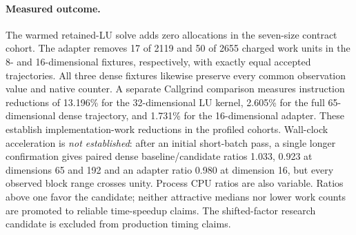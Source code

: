 \paragraph{Measured outcome.}
The warmed retained-LU solve adds zero allocations in the seven-size contract
cohort. The adapter removes 17 of 2119 and 50 of 2655 charged work units in the
8- and 16-dimensional fixtures, respectively, with exactly equal accepted
trajectories. All three dense fixtures likewise preserve every common observation
value and native counter. A separate Callgrind comparison measures instruction
reductions of 13.196\% for the 32-dimensional LU kernel, 2.605\% for the full
65-dimensional dense trajectory, and 1.731\% for the 16-dimensional adapter.
These establish implementation-work reductions in the profiled cohorts.
Wall-clock acceleration is \emph{not established}:
after an initial short-batch pass, a single longer confirmation gives paired
dense baseline/candidate ratios 1.033, 0.923 at dimensions 65 and 192 and
an adapter ratio 0.980 at dimension 16, but every observed block range
crosses unity. Process CPU ratios are also variable. Ratios above one favor
the candidate; neither attractive medians nor lower work counts are promoted
to reliable time-speedup claims. The shifted-factor research candidate is
excluded from production timing claims.
